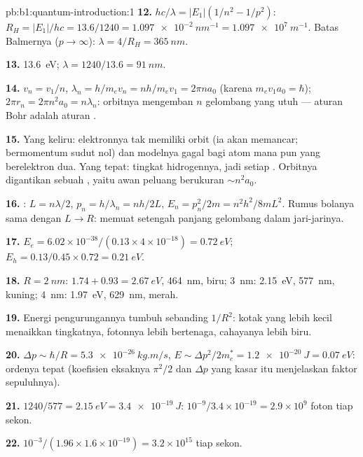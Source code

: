 \begin{solution}{pb:b1:quantum-introduction:1}
\textbf{12.} $hc/\lambda = |E_1|(1/n^2 - 1/p^2)$: $R_H = |E_1|/hc = 13.6/1240 =
\qty{1.097e-2}{nm^{-1}} = \qty{1.097e7}{m^{-1}}$. Batas Balmernya ($p \to \infty$):
$\lambda = 4/R_H = \qty{365}{nm}$.

\textbf{13.} \qty{13.6}{eV}; $\lambda = 1240/13.6 = \qty{91}{nm}$.

\textbf{14.} $v_n = v_1/n$, $\lambda_n = h/m_ev_n = nh/m_ev_1 = 2\pi na_0$ (karena $m_ev_1a_0
= \hbar$); $2\pi r_n = 2\pi n^2a_0 = n\lambda_n$: orbitnya mengemban $n$ gelombang
yang utuh --- aturan Bohr adalah aturan .

\textbf{15.} Yang keliru: elektronnya tak memiliki orbit (ia akan memancar;
 bermomentum sudut nol) dan modelnya gagal bagi atom mana pun
yang berelektron dua. Yang tepat: tingkat hidrogennya, jadi setiap . Orbitnya digantikan sebuah , yaitu awan peluang
berukuran $\sim n^2a_0$.

\textbf{16.} : $L = n\lambda/2$, $p_n = h/\lambda_n = nh/2L$, $E_n =
p_n^2/2m = n^2h^2/8mL^2$. Rumus bolanya sama dengan $L \to R$:
 memuat setengah panjang gelombang dalam jari-jarinya.

\textbf{17.} $E_e = 6.02 \times 10^{-38}/(0.13 \times 4 \times 10^{-18}) = \qty{0.72}{eV}$;
$E_h = 0.13/0.45 \times 0.72 = \qty{0.21}{eV}$.

\textbf{18.} $R = \qty{2}{nm}$: $1.74 + 0.93 = \qty{2.67}{eV}$, \qty{464}{nm}, biru;
\qty{3}{nm}: \qty{2.15}{eV}, \qty{577}{nm}, kuning; \qty{4}{nm}: \qty{1.97}{eV},
\qty{629}{nm}, merah.

\textbf{19.} Energi pengurungannya tumbuh sebanding $1/R^2$: kotak yang lebih kecil menaikkan
tingkatnya, fotonnya lebih bertenaga, cahayanya lebih biru.

\textbf{20.} $\Delta p \sim \hbar/R = \qty{5.3e-26}{kg.m/s}$, $E \sim \Delta p^2/2m_e^\ast =
\qty{1.2e-20}{J} = \qty{0.07}{eV}$: ordenya tepat (koefisien eksaknya
$\pi^2/2$ dan $\Delta p$ yang kasar itu menjelaskan faktor sepuluhnya).

\textbf{21.} $1240/577 = \qty{2.15}{eV} = \qty{3.4e-19}{J}$: $10^{-9}/3.4 \times 10^{-19}
= 2.9 \times 10^9$ foton tiap sekon.

\textbf{22.} $10^{-3}/(1.96 \times 1.6 \times 10^{-19}) = 3.2 \times 10^{15}$ tiap sekon.


\end{solution}
